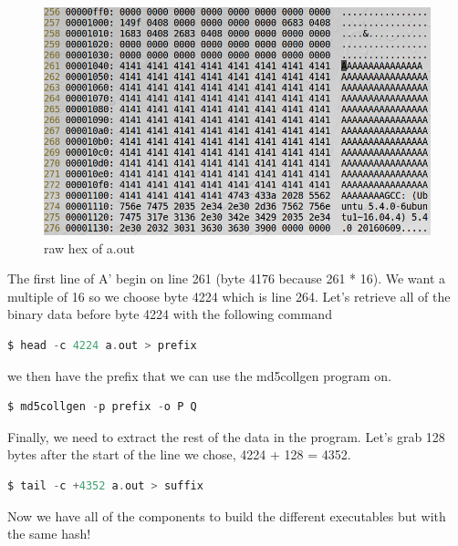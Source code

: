 \documentclass[12pt]{article}
\begin{document}
\begin{figure}[H]
	\begin{center}
		\includegraphics[scale=0.65]{pics/t3p0.png}
	\end{center}{}
	\caption{raw hex of a.out}
	\label{fig:t3p0}
\end{figure}

The first line of A' begin on line 261 (byte 4176 because 261 * 16). We want a multiple of 16 so we choose byte 4224 which is line 264. Let's retrieve all of the binary data before byte 4224 with the following command

\begin{lstlisting}[backgroundcolor = \color{lightgray},
	language = C,
	xleftmargin = 2cm,
	framexleftmargin = 1em]
$ head -c 4224 a.out > prefix
\end{lstlisting}

we then have the prefix that we can use the md5collgen program on.

\begin{lstlisting}[backgroundcolor = \color{lightgray},
language = C,
xleftmargin = 2cm,
framexleftmargin = 1em]
$ md5collgen -p prefix -o P Q
\end{lstlisting}

Finally, we need to extract the rest of the data in the program. Let's grab 128 bytes after the start of the line we chose, 4224 + 128 = 4352.

\begin{lstlisting}[backgroundcolor = \color{lightgray},
language = C,
xleftmargin = 2cm,
framexleftmargin = 1em]
$ tail -c +4352 a.out > suffix
\end{lstlisting}

Now we have all of the components to build the different executables but with the same hash!
\end{document}
